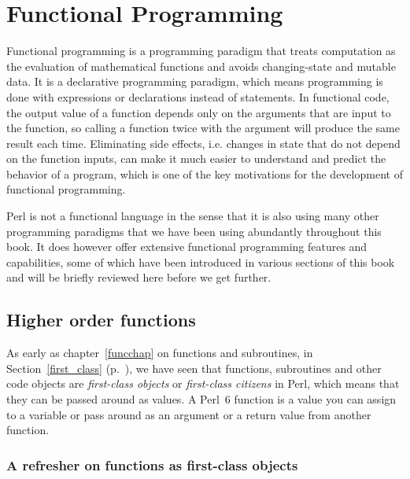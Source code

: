 \chapter{Functional Programming}
\label{functional programming}

Functional programming is a programming paradigm that treats 
computation as the evaluation of mathematical functions 
and avoids changing-state and mutable data. It is a 
declarative programming paradigm, which means programming 
is done with expressions or declarations instead of 
statements. In functional code, the output value of a function 
depends only on the arguments that are input to the function, 
so calling a function twice with the argument will produce the 
same result each time. Eliminating side effects, i.e. changes 
in state that do not depend on the function inputs, can make 
it much easier to understand and predict the behavior of a 
program, which is one of the key motivations for the 
development of functional programming.

Perl is not a functional language in the sense that it is 
also using many other programming paradigms that we have been 
using abundantly throughout this book. It does however 
offer extensive functional programming features and 
capabilities, some of which have been introduced in 
various sections of this book and will be briefly 
reviewed here before we get further.

\section{Higher order functions}

As early as chapter~\ref{funcchap} on functions and 
subroutines, in Section~\ref{first_class} 
(p.~\pageref{first_class}), we have seen that functions,  
subroutines and other code objects are \emph{first-class 
objects} or \emph{first-class citizens} in Perl, which 
means that they can be passed around as values. A Perl~6 
function is a value you can assign to a variable or pass 
around as an argument or a return value from another 
function.

\subsection{A refresher on functions as first-class objects}
\label{fco-refresher}

